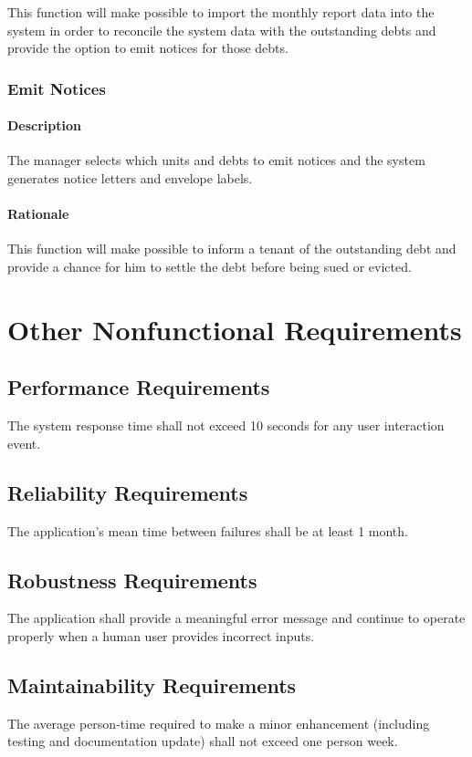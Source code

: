\documentclass{scrreprt}
\begin{document}
This function will make possible to import the monthly report data into the system in order to reconcile the system data with the outstanding debts and provide the option to emit notices for those debts.

\subsection{Emit Notices}
\subsubsection{Description}

The manager selects which units and debts to emit notices and the system generates notice letters and envelope labels.

\subsubsection{Rationale}

This function will make possible to inform a tenant of the outstanding debt and provide a chance for him to settle the debt before being sued or evicted.

\chapter{Other Nonfunctional Requirements}

\section{Performance Requirements}
The system response time shall not exceed 10 seconds for any user interaction event.

\section{Reliability Requirements}
The application’s mean time between failures shall be at least 1 month.

\section{Robustness Requirements}
The application shall provide a meaningful error message and continue to operate properly when a human user provides incorrect inputs.

\section{Maintainability Requirements}
The average person-time required to make a minor enhancement (including testing and documentation update) shall not exceed one person week.
\end{document}
